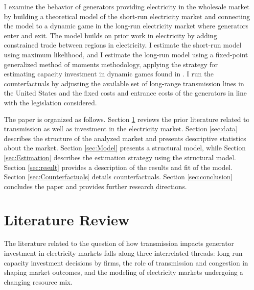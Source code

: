 \documentclass[12pt]{article}
\begin{document}
I examine the behavior of generators providing electricity in the wholesale market by building a theoretical model of the short-run electricity market and connecting the model to a dynamic game in the long-run electricity market where generators enter and exit. The model builds on prior work in electricity by adding constrained trade between regions in electricity. I estimate the short-run model using maximum likelihood, and I estimate the long-run model using a fixed-point generalized method of moments methodology, applying the strategy for estimating capacity investment in dynamic games found in \cite{gowrisankaran2024computable}. I run the counterfactuals by adjusting the available set of long-range transmission lines in the United States and the fixed costs and entrance costs of the generators in line with the legislation considered.

 The paper is organized as follows. Section \ref{sec:literature} reviews the prior literature related to transmission as well as investment in the electricity market. Section \ref{sec:data} describes the structure of the analyzed market and presents descriptive statistics about the market. Section \ref{sec:Model} presents a structural model, while Section \ref{sec:Estimation} describes the estimation strategy using the structural model. Section \ref{sec:result} provides a description of the results and fit of the model.  Section \ref{sec:Counterfactuals} details counterfactuals. Section \ref{sec:conclusion} concludes the paper and provides further research directions.

\section{Literature Review} \label{sec:literature}
 
The literature related to the question of how transmission impacts generator investment in electricity markets falls along three interrelated threads: long-run capacity investment decisions by firms, the role of transmission and congestion in shaping market outcomes, and the modeling of electricity markets undergoing a changing resource mix.
 
\end{document}
